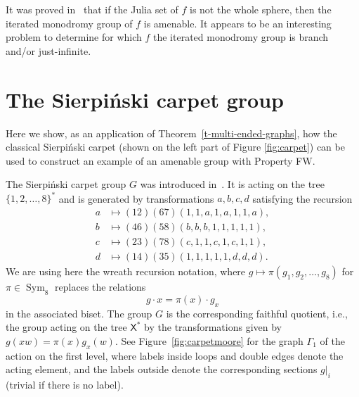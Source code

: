 \documentclass[11pt]{amsart}
\newcommand{\xs}{\alb^\ast}
\newcommand{\Sym}{\mathop{\mathrm{Sym}}\nolimits}
\newcommand{\alb}{\ensuremath{\mathsf{X}}}%
\theoremstyle{definition}
\theoremstyle{plain}
\newtheorem{main thm}{Theorem}
\theoremstyle{remark}
\theoremstyle{plain}
\begin{document}
It was proved in~\cite{MNZ} that if the Julia set of $f$ is not the whole sphere, then the iterated monodromy group of $f$ is amenable. It appears to be an interesting problem to determine for which $f$ the iterated monodromy group is branch and/or just-infinite. 




	

\section{The Sierpi\'nski carpet group} \label{s-sierpinski}
	
Here we show, as an application of Theorem~\ref{t-multi-ended-graphs}, how the classical Sierpi\'nski carpet (shown on the left part of Figure \ref{fig:carpet}) can be used to construct an example of an amenable group with Property FW.

The Sierpi\'nski carpet group $G$ was  introduced in~\cite[\S6.3]{MNZ}. It is acting on the tree $\{1, 2, \ldots, 8\}^\ast$ and is generated by transformations $a, b, c, d$ satisfying the recursion
\begin{align*}
a &\mapsto(12)(67)(1, 1, a, 1, a, 1, 1, a),\\
b &\mapsto(46)(58)(b, b, b, 1, 1, 1, 1, 1),\\
c &\mapsto(23)(78)(c, 1, 1, c, 1, c, 1, 1),\\
d &\mapsto(14)(35)(1, 1, 1, 1, 1, d, d, d).
\end{align*}
We are using here the wreath recursion notation, where $g\mapsto\pi(g_1, g_2, \ldots, g_8)$ for $\pi\in\Sym_8$ replaces the relations 
\[g\cdot x=\pi(x)\cdot g_x\]
in the associated biset. The group $G$ is the corresponding faithful quotient, i.e., the group acting on the tree $\xs$ by the transformations given by $g(xw)=\pi(x)g_x(w)$. 
See Figure~\ref{fig:carpetmoore} for the graph $\Gamma_1$ of the action on the first level, where labels inside loops and double edges denote the acting element, and the labels outside denote the corresponding sections $g|_i$ (trivial if there is no label).
\end{document}
